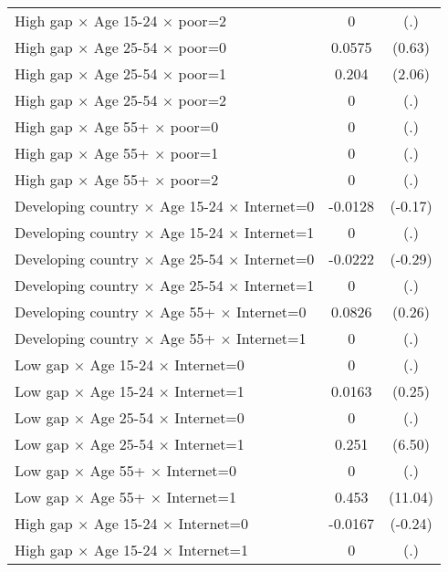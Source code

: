 {\begin{longtable}{l*{1}{cc}}
High gap $\times$ Age 15-24 $\times$ poor=2&           0         &         (.)\\
High gap $\times$ Age 25-54 $\times$ poor=0&      0.0575         &      (0.63)\\
High gap $\times$ Age 25-54 $\times$ poor=1&       0.204\sym{*}  &      (2.06)\\
High gap $\times$ Age 25-54 $\times$ poor=2&           0         &         (.)\\
High gap $\times$ Age 55+ $\times$ poor=0&           0         &         (.)\\
High gap $\times$ Age 55+ $\times$ poor=1&           0         &         (.)\\
High gap $\times$ Age 55+ $\times$ poor=2&           0         &         (.)\\
Developing country $\times$ Age 15-24 $\times$ Internet=0&     -0.0128         &     (-0.17)\\
Developing country $\times$ Age 15-24 $\times$ Internet=1&           0         &         (.)\\
Developing country $\times$ Age 25-54 $\times$ Internet=0&     -0.0222         &     (-0.29)\\
Developing country $\times$ Age 25-54 $\times$ Internet=1&           0         &         (.)\\
Developing country $\times$ Age 55+ $\times$ Internet=0&      0.0826         &      (0.26)\\
Developing country $\times$ Age 55+ $\times$ Internet=1&           0         &         (.)\\
Low gap $\times$ Age 15-24 $\times$ Internet=0&           0         &         (.)\\
Low gap $\times$ Age 15-24 $\times$ Internet=1&      0.0163         &      (0.25)\\
Low gap $\times$ Age 25-54 $\times$ Internet=0&           0         &         (.)\\
Low gap $\times$ Age 25-54 $\times$ Internet=1&       0.251\sym{***}&      (6.50)\\
Low gap $\times$ Age 55+ $\times$ Internet=0&           0         &         (.)\\
Low gap $\times$ Age 55+ $\times$ Internet=1&       0.453\sym{***}&     (11.04)\\
High gap $\times$ Age 15-24 $\times$ Internet=0&     -0.0167         &     (-0.24)\\
High gap $\times$ Age 15-24 $\times$ Internet=1&           0         &         (.)\\

\end{longtable}}
